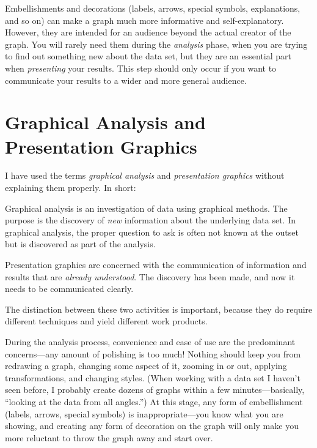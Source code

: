  Embellishments 
and decorations (labels, arrows, special symbols, explanations, and so
on) can make a graph much more informative and self-explanatory.
However, they are intended for an audience beyond the actual creator
of the graph. You will rarely need them during the \emph{analysis}
phase, when you are trying to find out something new about the data
set, but they are an essential part when \emph{presenting} your
results. This step should only occur if you want to communicate your
results to a wider and more general audience.

\section{Graphical Analysis and Presentation Graphics}

 
I have used the terms \emph{graphical analysis} and \emph{presentation
  graphics} without explaining them properly. In short:

\begin{unnumlist}
\item Graphical analysis is an investigation of
  data using graphical methods. The purpose is the discovery of
  \emph{new} information about the underlying data set. In graphical
  analysis, the proper question to ask is often not known at the
  outset but is discovered as part of the analysis.

\item Presentation graphics are concerned with
  the communication of information and results that are \emph{already
    understood}. The discovery has been made, and now it needs to be
  communicated clearly.
\end{unnumlist}

The distinction between these two activities is important, because
they do require different techniques and yield different work products.

During the analysis process, convenience and ease of use are the
predominant concerns---any amount of polishing is too much! Nothing
should keep you from redrawing a graph, changing some aspect of it,
zooming in or out, applying transformations, and changing styles.
(When working with a data set I haven't seen before, I probably create
dozens of graphs within a few minutes---basically, ``looking at the
data from all angles.'')  At this stage, any form of embellishment
(labels, arrows, special symbols) is inappropriate---you know what you
are showing, and creating any form of decoration on the graph will
only make you more reluctant to throw the graph away and start over.

